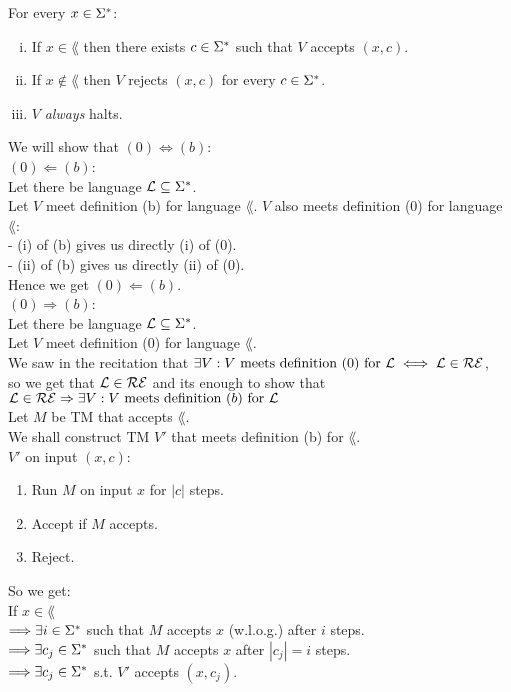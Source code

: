 For every $x \in \Sigma^*$:
\begin{enumerate}[(i)]
    \item If $x \in \lang$ then there exists $c \in \Sigma^*$ such that $V$ accepts $(x, c)$.
    \item If $x \notin \lang$ then $V$ rejects $(x, c)$ for every $c \in \Sigma^*$.
    \item $V$ \textit{always} halts.
\end{enumerate}

We will show that $(0) \iff (b)$: \\

\underline{$(0) \Leftarrow (b)$}: \\
Let there be language $\mathcal{L} \subseteq \Sigma^*$. \\
Let $V$ meet definition (b) for language $\lang$. $V$ also meets definition (0) for language $\lang$: \\
- (i) of (b) gives us directly (i) of (0). \\
- (ii) of (b) gives us directly (ii) of (0). \\
Hence we get $(0) \Leftarrow (b)$. \\

\underline{$(0) \Rightarrow (b)$}: \\
Let there be language $\mathcal{L} \subseteq \Sigma^*$. \\
Let $V$ meet definition (0) for language $\lang$. \\
We saw in the recitation that $\exists V: V \text{ meets definition } (0) \text{ for } \mathcal{L} \iff \mathcal{L} \in \mathcal{R}\mathcal{E}$, \\
so we get that $\mathcal{L} \in \mathcal{R}\mathcal{E}$ and its enough to show that $\mathcal{L} \in \mathcal{R}\mathcal{E} \Rightarrow \exists V: V \text{ meets definition } (b) \text{ for } \mathcal{L}$  \\
Let $M$ be TM that accepts $\lang$. \\
We shall construct TM $V'$ that meets definition (b) for $\lang$. \\
$V'$ on input $(x, c)$:
\begin{enumerate}[1., itemsep=5pt]
    \item Run $M$ on input $x$ for $|c|$ steps.
    \item Accept if $M$ accepts.
    \item Reject.
\end{enumerate}

So we get: \\
If $x \in \lang$ \\
$\Longrightarrow \exists i \in \Sigma^*$ such that $M$ accepts $x$ (w.l.o.g.) after $i$ steps. \\
$\Longrightarrow \exists c_j \in \Sigma^*$ such that $M$ accepts $x$ after $|c_j|=i$ steps. \\
$\Longrightarrow \exists c_j \in \Sigma^*$ s.t. $V'$ accepts $(x, c_j)$. \\

